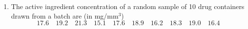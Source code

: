 \begin{enumerate}[leftmargin=*]
% 
% 
\item  The active ingredient concentration of a random sample of 10 drug containers drawn from a batch are (in
mg/mm$^{3}$)
\[
17.6\quad 19.2\quad 21.3\quad 15.1\quad 17.6\quad 18.9\quad 16.2\quad 18.3\quad 19.0\quad 16.4
\]


\end{enumerate}
